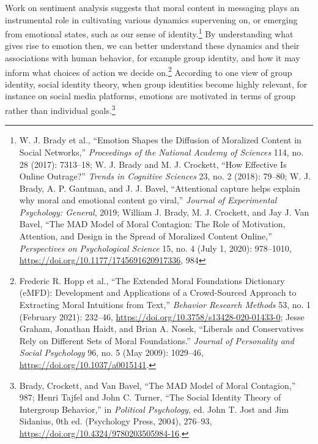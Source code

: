 \documentclass[phdthesis,12pt,final]{wuthesis}
\theoremstyle{definition}
\theoremstyle{definition}
\theoremstyle{definition}
\theoremstyle{definition}
\theoremstyle{remark}
\begin{document}
Work on sentiment analysis suggests that moral content in messaging plays an instrumental role in cultivating various dynamics supervening on, or emerging from emotional states, such as our sense of identity.\footnote{W. J. Brady et al., {``Emotion Shapes the Diffusion of Moralized Content in Social Networks,''} \emph{Proceedings of the National Academy of Sciences} 114, no. 28 (2017): 7313--18; W. J. Brady and M. J. Crockett, {``How Effective Is Online Outrage?''} \emph{Trends in Cognitive Sciences} 23, no. 2 (2018): 79--80; W. J. Brady, A. P. Gantman, and J. J. Bavel, {``Attentional capture helps explain why moral and emotional content go viral,''} \emph{Journal of Experimental Psychology: General}, 2019; William J. Brady, M. J. Crockett, and Jay J. Van Bavel, {``The {MAD} Model of Moral Contagion: The Role of Motivation, Attention, and Design in the Spread of Moralized Content Online,''} \emph{Perspectives on Psychological Science} 15, no. 4 (July 1, 2020): 978--1010, \url{https://doi.org/10.1177/1745691620917336}, 984} By understanding what gives rise to emotion then, we can better understand these dynamics and their associations with human behavior, for example group identity, and how it may inform what choices of action we decide on.\footnote{Frederic R. Hopp et al., {``The Extended {Moral Foundations Dictionary} ({eMFD}): {Development} and Applications of a Crowd-Sourced Approach to Extracting Moral Intuitions from Text,''} \emph{Behavior Research Methods} 53, no. 1 (February 2021): 232--46, \url{https://doi.org/10.3758/s13428-020-01433-0}; Jesse Graham, Jonathan Haidt, and Brian A. Nosek, {``Liberals and Conservatives Rely on Different Sets of Moral Foundations.''} \emph{Journal of Personality and Social Psychology} 96, no. 5 (May 2009): 1029--46, \url{https://doi.org/10.1037/a0015141}.} According to one view of group identity, social identity theory, when group identities become highly relevant, for instance on social media platforms, emotions are motivated in terms of group rather than individual goals.\footnote{Brady, Crockett, and Van Bavel, {``The {MAD} Model of Moral Contagion,''} 987; Henri Tajfel and John C. Turner, {``The {Social Identity Theory} of {Intergroup Behavior},''} in \emph{Political {Psychology}}, ed. John T. Jost and Jim Sidanius, 0th ed. (Psychology Press, 2004), 276--93, \url{https://doi.org/10.4324/9780203505984-16}.}
\end{document}

